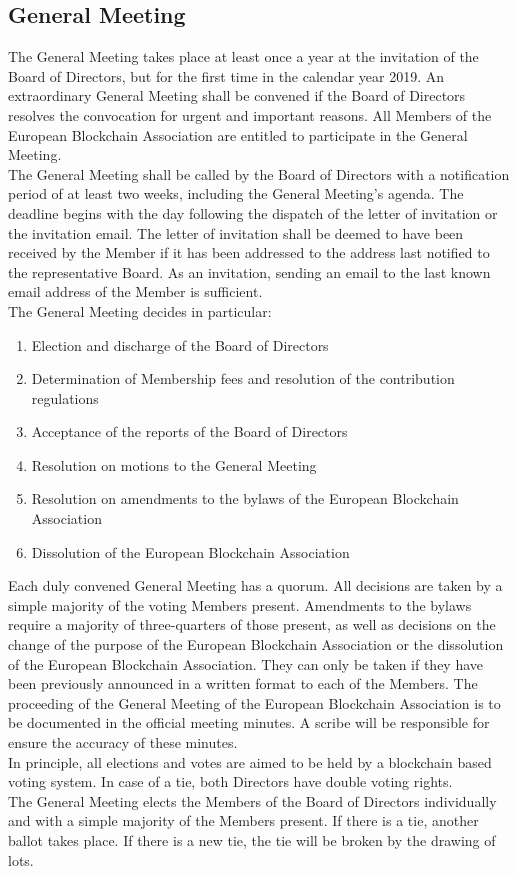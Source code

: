 \documentclass{article}
\begin{document}
\subsection{General Meeting}

The General Meeting takes place at least once a year at the invitation of the Board of Directors, but for the first time in the calendar year 2019. 
An extraordinary General Meeting shall be convened if the Board of Directors resolves the convocation for urgent and important reasons. 
All Members of the European Blockchain Association are entitled to participate in the General Meeting. \\
The General Meeting shall be called by the Board of Directors with a notification period of at least two weeks, including the General Meeting’s agenda. 
The deadline begins with the day following the dispatch of the letter of invitation or the invitation email. 
The letter of invitation shall be deemed to have been received by the Member if it has been addressed to the address last notified to the representative Board. 
As an invitation, sending an email to the last known email address of the Member is sufficient. \\

The General Meeting decides in particular:

\begin{enumerate}
	\item Election and discharge of the Board of Directors
	\item Determination of Membership fees and resolution of the contribution regulations
	\item Acceptance of the reports of the Board of Directors
	\item Resolution on motions to the General Meeting
	\item Resolution on amendments to the bylaws of the European Blockchain Association
	\item Dissolution of the European Blockchain Association	
\end{enumerate}

Each duly convened General Meeting has a quorum. All decisions are taken by a simple majority of the voting Members present. 
Amendments to the bylaws require a majority of three-quarters of those present, as well as decisions on the change of the purpose of the European Blockchain Association or the dissolution of the European Blockchain Association. 
They can only be taken if they have been previously announced in a written format to each of the Members. 
The proceeding of the General Meeting of the European Blockchain Association is to be documented in the official meeting minutes. 
A scribe will be responsible for ensure the accuracy of these minutes. \\
In principle, all elections and votes are aimed to be held by a blockchain based voting system. 
In case of a tie, both Directors have double voting rights. \\
The General Meeting elects the Members of the Board of Directors individually and with a simple majority of the Members present. 
If there is a tie, another ballot takes place. If there is a new tie, the tie will be broken by the drawing of lots.
\end{document}
